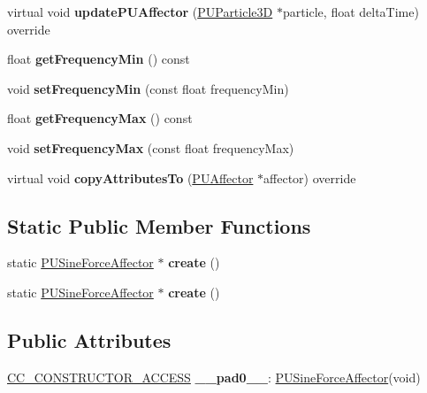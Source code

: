 \begin{DoxyCompactItemize}
virtual void {\bfseries update\+P\+U\+Affector} (\hyperlink{structPUParticle3D}{P\+U\+Particle3D} $\ast$particle, float delta\+Time) override
\item 
\mbox{\label{classPUSineForceAffector_a151136062df4d5209de0b9c5aa7cd13b}} 
float {\bfseries get\+Frequency\+Min} () const
\item 
\mbox{\label{classPUSineForceAffector_abd4e5e8de6e3c36176c86b843b38fa5d}} 
void {\bfseries set\+Frequency\+Min} (const float frequency\+Min)
\item 
\mbox{\label{classPUSineForceAffector_ae1c888502fa30aeed1c5f08769c48220}} 
float {\bfseries get\+Frequency\+Max} () const
\item 
\mbox{\label{classPUSineForceAffector_a5cde261c1733c4e1ead208b1e72ee668}} 
void {\bfseries set\+Frequency\+Max} (const float frequency\+Max)
\item 
\mbox{\label{classPUSineForceAffector_a629a970961bd801f01cccb0eaeaa58b4}} 
virtual void {\bfseries copy\+Attributes\+To} (\hyperlink{classPUAffector}{P\+U\+Affector} $\ast$affector) override
\end{DoxyCompactItemize}
\subsection*{Static Public Member Functions}
\begin{DoxyCompactItemize}
\item 
\mbox{\label{classPUSineForceAffector_ac67bc6631f946b15fc26162dfe1b6d63}} 
static \hyperlink{classPUSineForceAffector}{P\+U\+Sine\+Force\+Affector} $\ast$ {\bfseries create} ()
\item 
\mbox{\label{classPUSineForceAffector_abe81066784b97e484f29ab2fd555378d}} 
static \hyperlink{classPUSineForceAffector}{P\+U\+Sine\+Force\+Affector} $\ast$ {\bfseries create} ()
\end{DoxyCompactItemize}
\subsection*{Public Attributes}
\begin{DoxyCompactItemize}
\item 
\mbox{\label{classPUSineForceAffector_ab489f724b2f677d73a060eb1dd6887ee}} 
\hyperlink{_2cocos2d_2cocos_2base_2ccConfig_8h_a25ef1314f97c35a2ed3d029b0ead6da0}{C\+C\+\_\+\+C\+O\+N\+S\+T\+R\+U\+C\+T\+O\+R\+\_\+\+A\+C\+C\+E\+SS} {\bfseries \+\_\+\+\_\+pad0\+\_\+\+\_\+}\+: \hyperlink{classPUSineForceAffector}{P\+U\+Sine\+Force\+Affector}(void)
\end{DoxyCompactItemize}
